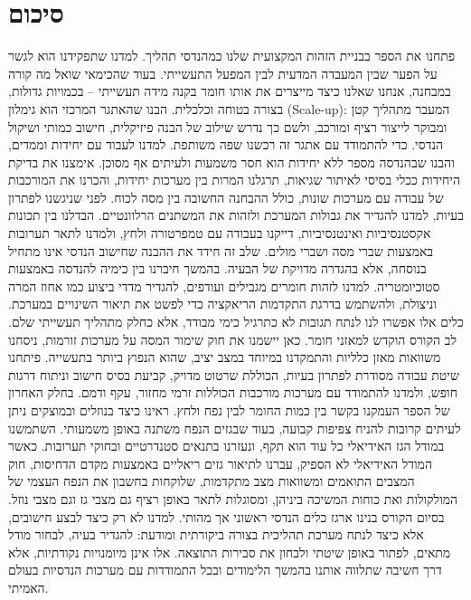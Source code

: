 \documentclass[
  hebrew,
  letterpaper,
  DIV=11,
  numbers=noendperiod]{scrreprt}
\begin{document}

\chapter{סיכום}\label{ux5e1ux5d9ux5dbux5d5ux5dd-11}

פתחנו את הספר בבניית הזהות המקצועית שלנו כמהנדסי תהליך. למדנו שתפקידנו
הוא לגשר על הפער שבין המעבדה המדעית לבין המפעל התעשייתי. בעוד שהכימאי
שואל מה קורה במבחנה, אנחנו שאלנו כיצד מייצרים את אותו חומר בקנה מידה
תעשייתי -- בכמויות גדולות, בצורה בטוחה וכלכלית. הבנו שהאתגר המרכזי הוא
גימלון (Scale-up): המעבר מתהליך קטן ומבוקר לייצור רציף ומורכב, ולשם כך
נדרש שילוב של הבנה פיזיקלית, חישוב כמותי ושיקול הנדסי. כדי להתמודד עם
אתגר זה רכשנו שפה משותפת. למדנו לעבוד עם יחידות וממדים, והבנו שבהנדסה
מספר ללא יחידות הוא חסר משמעות ולעיתים אף מסוכן. אימצנו את בדיקת היחידות
ככלי בסיסי לאיתור שגיאות, תרגלנו המרות בין מערכות יחידות, והכרנו את
המורכבות של עבודה עם מערכות שונות, כולל ההבחנה החשובה בין מסה לכוח. לפני
שניגשנו לפתרון בעיות, למדנו להגדיר את גבולות המערכת ולזהות את המשתנים
הרלוונטיים. הבדלנו בין תכונות אקסטנסיביות ואינטנסיביות, דייקנו בעבודה עם
טמפרטורה ולחץ, ולמדנו לתאר תערובות באמצעות שברי מסה ושברי מולים. שלב זה
חידד את ההבנה שחישוב הנדסי אינו מתחיל בנוסחה, אלא בהגדרה מדויקת של
הבעיה. בהמשך חיברנו בין כימיה להנדסה באמצעות סטוכיומטריה. למדנו לזהות
חומרים מגבילים ועודפים, להגדיר מדדי ביצוע כמו אחוז המרה וניצולת, ולהשתמש
בדרגת התקדמות הריאקציה כדי לפשט את תיאור השינויים במערכת. כלים אלו אפשרו
לנו לנתח תגובות לא כתרגיל כימי מבודד, אלא כחלק מתהליך תעשייתי שלם. לב
הקורס הוקדש למאזני חומר. כאן יישמנו את חוק שימור המסה על מערכות זורמות,
ניסחנו משוואות מאזן כלליות והתמקדנו במיוחד במצב יציב, שהוא הנפוץ ביותר
בתעשייה. פיתחנו שיטת עבודה מסודרת לפתרון בעיות, הכוללת שרטוט מדויק,
קביעת בסיס חישוב וניתוח דרגות חופש, ולמדנו להתמודד עם מערכות מורכבות
הכוללות זרמי מחזור, עקף ודמם. בחלק האחרון של הספר העמקנו בקשר בין כמות
החומר לבין נפח ולחץ. ראינו כיצד בנוזלים ובמוצקים ניתן לעיתים קרובות
להניח צפיפות קבועה, בעוד שבגזים הנפח משתנה באופן משמעותי. השתמשנו במודל
הגז האידיאלי כל עוד הוא תקף, ונעזרנו בתנאים סטנדרטיים ובחוקי תערובות.
כאשר המודל האידיאלי לא הספיק, עברנו לתיאור גזים ריאליים באמצעות מקדם
הדחיסות, חוק המצבים התואמים ומשוואות מצב מתקדמות, שלוקחות בחשבון את הנפח
העצמי של המולקולות ואת כוחות המשיכה ביניהן, ומסוגלות לתאר באופן רציף גם
מצבי גז וגם מצבי נוזל. בסיום הקורס בנינו ארגז כלים הנדסי ראשוני אך
מהותי. למדנו לא רק כיצד לבצע חישובים, אלא כיצד לנתח מערכת תהליכית בצורה
ביקורתית ומודעת: להגדיר בעיה, לבחור מודל מתאים, לפתור באופן שיטתי ולבחון
את סבירות התוצאה. אלו אינן מיומנויות נקודתיות, אלא דרך חשיבה שתלווה
אותנו בהמשך הלימודים ובכל התמודדות עם מערכות הנדסיות בעולם האמיתי.
\end{document}
